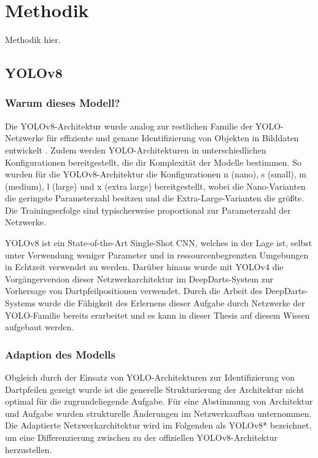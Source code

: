 
\section{Methodik}
\label{sec:ki:methodik}

Methodik hier.


\subsection{YOLOv8}
\label{sec:warum_yolov8}

\subsubsection{Warum dieses Modell?}

Die YOLOv8-Architektur wurde analog zur restlichen Familie der YOLO-Netzwerke für effiziente und genaue Identifizierung von Objekten in Bilddaten entwickelt \cite{yolov8_paper,adamw_yolo}. Zudem werden YOLO-Architekturen in unterschiedlichen Konfigurationen bereitgestellt, die dir Komplexität der Modelle bestimmen. So wurden für die YOLOv8-Architektur die Konfigurationen n (nano), s (small), m (medium), l (large) und x (extra large) bereitgestellt, wobei die Nano-Varianten die geringste Parameterzahl besitzen und die Extra-Large-Varianten die größte. Die Trainingserfolge sind typischerweise proportional zur Parameterzahl der Netzwerke.


YOLOv8 ist ein State-of-the-Art Single-Shot CNN, welches in der Lage ist, selbst unter Verwendung weniger Parameter und in ressourcenbegrenzten Umgebungen in Echtzeit verwendet zu werden. Darüber hinaus wurde mit YOLOv4 die Vorgängerversion dieser Netzwerkarchitektur im DeepDarts-System zur Vorhersage von Dartpfeilpositionen verwendet. Durch die Arbeit des DeepDarts-Systems wurde die Fähigkeit des Erlernens dieser Aufgabe durch Netzwerke der YOLO-Familie bereits erarbeitet und es kann in dieser Thesis auf diesem Wissen aufgebaut werden.

\subsubsection{Adaption des Modells}
\label{sec:yolo_adaption}

Obgleich durch \citeauthor{deepdarts} der Einsatz von YOLO-Architekturen zur Identifizierung von Dartpfeilen gezeigt wurde ist die generelle Strukturierung der Architektur nicht optimal für die zugrundeliegende Aufgabe. Für eine Abstimmung von Architektur und Aufgabe wurden strukturelle Änderungen im Netzwerkaufbau unternommen. Die Adaptierte Netzwerkarchitektur wird im Folgenden als YOLOv8* bezeichnet, um eine Differenzierung zwischen zu der offiziellen YOLOv8-Architektur herzustellen.

